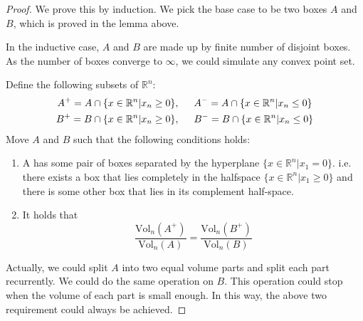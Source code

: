 \begin{proof}
  We prove this by induction. We pick the base case to be two boxes $A$ and $B$, which is proved in the lemma above.

  In the inductive case, $A$ and $B$ are made up by finite number of disjoint boxes. As the number of boxes converge to $\infty$, we could simulate any convex point set.

  Define the following subsets of $\mathbb{R}^n$:
  \begin{align*}
    A^+ = A\cap \{x\in\mathbb{R}^n|x_n\geq 0\} &,\hspace{0.5cm} A^- = A\cap \{x\in\mathbb{R}^n|x_n\leq 0\} \\
    B^+ = B\cap \{x\in\mathbb{R}^n|x_n\geq 0\} &,\hspace{0.5cm} B^- = B\cap \{x\in\mathbb{R}^n|x_n\leq 0\} \\
  \end{align*}
  Move $A$ and $B$ such that the following conditions holds:
  \begin{enumerate}
  \item A has some pair of boxes separated by the hyperplane $\{x \in \mathbb{R}^n|x_1 = 0\}$. i.e. there exists a box that lies completely in the halfspace $\{x \in \mathbb{R}^n|x_1 \geq 0\}$ and there is some other box that lies in its complement half-space.
  \item It holds that
    \[\frac{\mathrm{Vol}_n(A^+)}{\mathrm{Vol}_n(A)} = \frac{\mathrm{Vol}_n(B^+)}{\mathrm{Vol}_n(B)}\]
  \end{enumerate}
  Actually, we could split $A$ into two equal volume parts and split each part recurrently. We could do the same operation on $B$. This operation could stop when the volume of each part is small enough. In this way, the above two requirement could always be achieved.


\end{proof}
